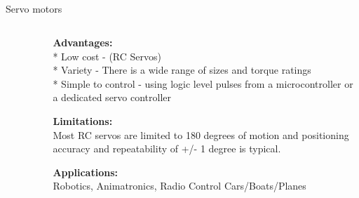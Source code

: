 \subsection{}
{
\begin{frame}{Servo motors}

\begin{columns}
\begin{column}{0.4\textwidth}  %

	\vspace{-3mm}
   	\begin{figure}
 	\end{figure}

\end{column}

\begin{column}{0.6\textwidth}

{\bf Advantages:} \\
* Low cost - (RC Servos) \\
* Variety - There is a wide range of sizes and torque ratings \\
* Simple to control - using logic level pulses from a microcontroller or a dedicated servo controller

{\bf Limitations:} \\
 Most RC servos are limited to 180 degrees of motion and positioning accuracy and repeatability of +/- 1 degree is typical.


{\bf Applications:} \\
Robotics,
Animatronics, 
Radio Control Cars/Boats/Planes



\end{column}
\end{columns}
\end{frame}
}




